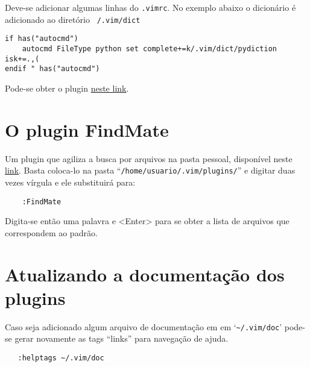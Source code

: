 Deve-se adicionar algumas linhas do {\tt .vimrc}.
No exemplo abaixo o dicionário é adicionado ao diretório {\tt ~/.vim/dict}
\begin{verbatim}
if has("autocmd")
    autocmd FileType python set complete+=k/.vim/dict/pydiction isk+=.,(
endif " has("autocmd") 
\end{verbatim}

Pode-se obter o plugin  \href{http://www.vim.org/scripts/script.php?script\_id=850}{neste link}.

\section{O plugin FindMate}
\label{sec:O plugin FindMate}

Um plugin que agiliza a busca por arquivos na pasta pessoal, disponível neste
 \href{http://snipt.net/voyeg3r/findmate-plugin-for-vim/}{link}. Basta
coloca-lo na pasta ``{\tt /home/usuario/.vim/plugins/}'' e digitar duas vezes
vírgula e ele substituirá para:

\begin{verbatim}
    :FindMate 
\end{verbatim}

Digita-se então uma palavra e <Enter> para se obter a lista de arquivos que
correspondem ao padrão.

\section{Atualizando a documentação dos plugins}
\label{sec:Atualizando a documentacao dos plugins}

Caso seja adicionado algum arquivo de documentação em em `\verb+~/.vim/doc+' pode-se
gerar novamente as tags ``links'' para navegação de ajuda.

\begin{verbatim}
   :helptags ~/.vim/doc
\end{verbatim}
